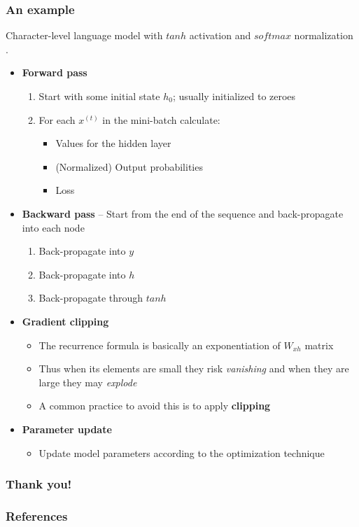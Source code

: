 \documentclass{beamer}
\begin{document}
\begin{frame}[allowframebreaks]
  \frametitle{An example}
  Character-level language model with \(tanh\) activation and \(softmax\) normalization \cite{rnn-gist} \cite{goodfellow-et-al-2016}.
  \begin{itemize}
    \item \textbf{Forward pass}
      \begin{enumerate}
        \item Start with some initial state \(h_0\); usually initialized to zeroes
        \item For each \(x^{(t)}\) in the mini-batch calculate:
          \begin{itemize}
            \item Values for the hidden layer
            \item (Normalized) Output probabilities
            \item Loss
          \end{itemize}
        \end{enumerate}
    \framebreak
  \item \textbf{Backward pass} -- Start from the end of the sequence and back-propagate into each node
    \begin{enumerate}
      \item Back-propagate into \(y\)
      \item Back-propagate into \(h\)
      \item Back-propagate through \(tanh\)
      \end{enumerate}
  \framebreak
  \item \textbf{Gradient clipping}
    \begin{itemize}
      \item The recurrence formula is basically an exponentiation of \(W_{xh}\) matrix
      \item Thus when its elements are small they risk \textit{vanishing} and when they are large they may \textit{explode}
      \item A common practice to avoid this is to apply \textbf{clipping}
    \end{itemize}
  \framebreak
  \item \textbf{Parameter update}
    \begin{itemize}
      \item Update model parameters according to the optimization technique
      \end{itemize}
  \end{itemize}
\end{frame}
\begin{frame}
  \frametitle{Thank you!}
\end{frame}
\begin{frame}[allowframebreaks]
  \frametitle{References}
  
  
\end{frame}
\end{document}
